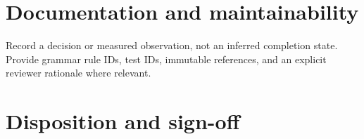 \documentclass[11pt,letterpaper]{article}
\begin{document}
\section{Documentation and maintainability}
Record a decision or measured observation, not an inferred completion state. Provide grammar rule IDs, test IDs, immutable references, and an explicit reviewer rationale where relevant.
\PTRating
\section{Disposition and sign-off}
\end{document}
